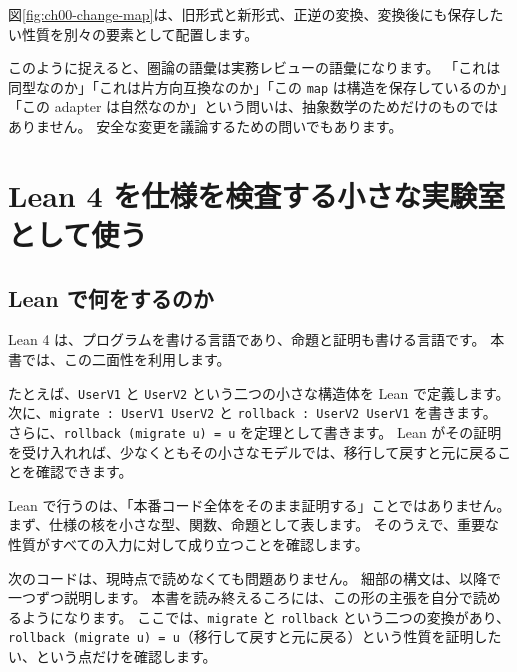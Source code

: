図\ref{fig:ch00-change-map}は、旧形式と新形式、正逆の変換、変換後にも保存したい性質を別々の要素として配置します。


このように捉えると、圏論の語彙は実務レビューの語彙になります。
「これは同型なのか」「これは片方向互換なのか」「この \texttt{map} は構造を保存しているのか」「この adapter は自然なのか」という問いは、抽象数学のためだけのものではありません。
安全な変更を議論するための問いでもあります。

\section{Lean 4 を仕様を検査する小さな実験室として使う}
\label{sec:ch00-lean-lab}

\subsection{Lean で何をするのか}

Lean 4 は、プログラムを書ける言語であり、命題と証明も書ける言語です。
本書では、この二面性を利用します。

たとえば、\texttt{UserV1} と \texttt{UserV2} という二つの小さな構造体を Lean で定義します。
次に、\texttt{migrate : UserV1 \to UserV2} と \texttt{rollback : UserV2 \to UserV1} を書きます。
さらに、\texttt{rollback (migrate u) = u} を定理として書きます。
Lean がその証明を受け入れれば、少なくともその小さなモデルでは、移行して戻すと元に戻ることを確認できます。

Lean で行うのは、「本番コード全体をそのまま証明する」ことではありません。
まず、仕様の核を小さな型、関数、命題として表します。
そのうえで、重要な性質がすべての入力に対して成り立つことを確認します。

次のコードは、現時点で読めなくても問題ありません。
細部の構文は、以降で一つずつ説明します。
本書を読み終えるころには、この形の主張を自分で読めるようになります。
ここでは、\texttt{migrate} と \texttt{rollback} という二つの変換があり、\texttt{rollback (migrate u) = u}（移行して戻すと元に戻る）という性質を証明したい、という点だけを確認します。

